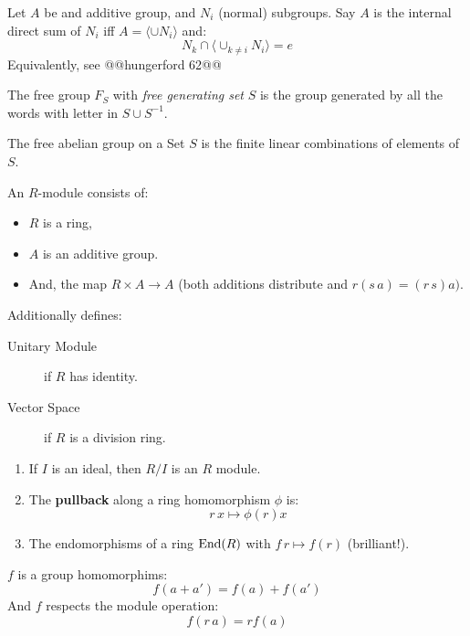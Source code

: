 \begin{ddef}
    Let $A$ be and additive group, and $N_i$ (normal) subgroups. Say $A$ is the internal direct sum of $N_i$ iff $A=\langle \cup N_i\rangle$ and:
    $$N_k \cap\langle \cup_{k\neq i}N_i\rangle=e $$
    Equivalently, see @@hungerford 62@@
\end{ddef}

\begin{ddef}
    The free group $F_S$ with \emph{free generating set} $S$ is the group generated by all the words with letter in $S\cup S^{-1}$.
\end{ddef}

\begin{ddef}
    The free abelian group on a Set $S$ is the finite linear combinations of elements of $S$.
\end{ddef}



\begin{ddef}[Modules]
An $R$-module consists of:
\begin{itemize}
\item $R$ is a ring, 
\item $A$ is an additive group.
\item And, the map $R\times A \to A$ (both additions distribute and $r(s\,a)=(r\,s)a)$.
\end{itemize}
Additionally defines:
\begin{description}
    \item[Unitary Module] if $R$ has identity.
    \item[Vector Space] if $R$ is a division ring.
\end{description}
\end{ddef}

\begin{examples}
    \begin{enumerate}
        \item If $I$ is an ideal, then $R/I$ is an $R$ module.
        \item The \textbf{pullback} along a ring homomorphism $\phi$ is:
            $$r\,x \mapsto \phi(r)x$$
        \item The endomorphisms of a ring $\operatorname{End}(R)$ with $f\,r \mapsto f(r)$ (brilliant!). 
    \end{enumerate}
\end{examples}

\begin{ddef}
    $f$ is a group homomorphims:
    $$f(a+a') = f(a)+f(a')$$
    And $f$ respects the module operation:
    $$f(r\,a) = rf(a)$$
\end{ddef}

